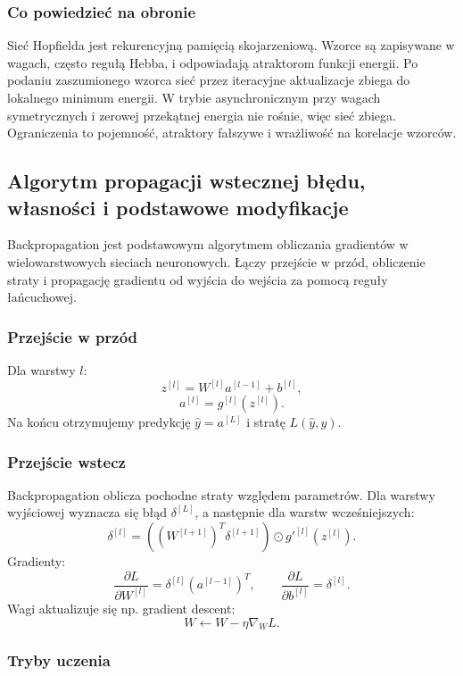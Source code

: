 \subsubsection{Co powiedzieć na obronie}

Sieć Hopfielda jest rekurencyjną pamięcią skojarzeniową. Wzorce są zapisywane w wagach, często regułą Hebba, i odpowiadają atraktorom funkcji energii. Po podaniu zaszumionego wzorca sieć przez iteracyjne aktualizacje zbiega do lokalnego minimum energii. W trybie asynchronicznym przy wagach symetrycznych i zerowej przekątnej energia nie rośnie, więc sieć zbiega. Ograniczenia to pojemność, atraktory fałszywe i wrażliwość na korelacje wzorców.

\subsection{Algorytm propagacji wstecznej błędu, własności i podstawowe modyfikacje}

Backpropagation jest podstawowym algorytmem obliczania gradientów w wielowarstwowych sieciach neuronowych. Łączy przejście w przód, obliczenie straty i propagację gradientu od wyjścia do wejścia za pomocą reguły łańcuchowej.

\subsubsection{Przejście w przód}

Dla warstwy $l$:
\[
z^{[l]}=W^{[l]}a^{[l-1]}+b^{[l]},
\]
\[
a^{[l]}=g^{[l]}(z^{[l]}).
\]
Na końcu otrzymujemy predykcję $\hat y=a^{[L]}$ i stratę $L(\hat y,y)$.

\subsubsection{Przejście wstecz}

Backpropagation oblicza pochodne straty względem parametrów. Dla warstwy wyjściowej wyznacza się błąd $\delta^{[L]}$, a następnie dla warstw wcześniejszych:
\[
\delta^{[l]}=\left((W^{[l+1]})^T\delta^{[l+1]}\right)\odot g'^{[l]}(z^{[l]}).
\]
Gradienty:
\[
\frac{\partial L}{\partial W^{[l]}}=\delta^{[l]}(a^{[l-1]})^T,\qquad
\frac{\partial L}{\partial b^{[l]}}=\delta^{[l]}.
\]
Wagi aktualizuje się np. gradient descent:
\[
W\leftarrow W-\eta\nabla_W L.
\]

\subsubsection{Tryby uczenia}

